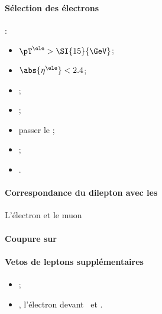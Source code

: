 \paragraph{Sélection des électrons}
:
\begin{itemize}
    \item $\pT^{\ele} > \SI{15}{\GeV}$;
    \item $\abs{\eta^{\ele}} < 2.4$;
    \item \Leptondzdxy;
    \item {};
    \item passer le \NinetyNineEleMVAnoIso;
    \item \LessTwoMissingHitsVertex;
    \item \PassConversionVeto.
\end{itemize}
\paragraph{Correspondance du dilepton avec les \HLTpaths}
L'électron et le muon \FromPairMatchToHLTObjects{}

\paragraph{Coupure sur \Dzeta}
\DzetaEleMU
\paragraph{Vetos de leptons supplémentaires}
\LeptonVetoes
\begin{itemize}
    \item \LeptonVetoesSecondMuon;
    \item \LeptonVetoesSecondEle, l'électron devant \PassConversionVeto\ et \LessTwoMissingHitsVertex.
\end{itemize}